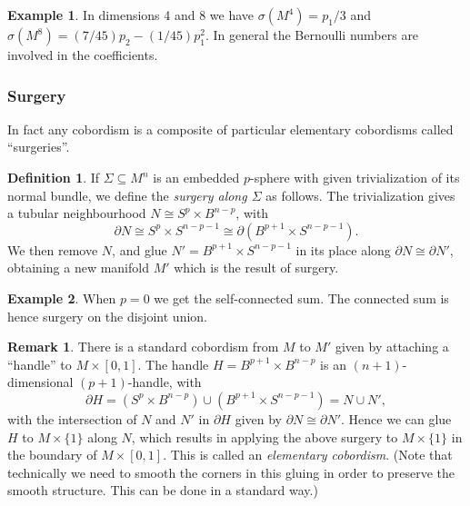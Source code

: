 \documentclass{article}
\theoremstyle{definition}
\newtheorem*{definition}{Definition}
\newtheorem*{example}{Example}
\newtheorem*{remark}{Remark}
\begin{document}
\begin{example}
    In dimensions 4 and 8 we have $\sigma(M^4)=p_1/3$ and
    $\sigma(M^8)=(7/45)p_2-(1/45)p_1^2$. In general the Bernoulli numbers are
    involved in the coefficients.
\end{example}

\subsubsection*{Surgery}

In fact any cobordism is a composite of particular elementary cobordisms called
``surgeries''.

\begin{definition}
    If $\Sigma\subseteq M^n$ is an embedded $p$-sphere with given trivialization
    of its normal bundle, we define the \emph{surgery along $\Sigma$} as
    follows. The trivialization gives a tubular neighbourhood
    $N\cong S^p\times B^{n-p}$, with
    \begin{equation*}
        \partial N
            \cong S^p\times S^{n-p-1}
            \cong \partial(B^{p+1}\times S^{n-p-1}).
    \end{equation*}
    We then remove $N$, and glue $N'=B^{p+1}\times S^{n-p-1}$ in its place along
    $\partial N\cong\partial N'$, obtaining a new manifold $M'$ which is the
    result of surgery.
\end{definition}

\begin{example}
    When $p=0$ we get the self-connected sum. The connected sum is hence surgery
    on the disjoint union.
\end{example}

\begin{remark}
    There is a standard cobordism from $M$ to $M'$ given by attaching a
    ``handle'' to $M\times[0,1]$. The handle $H=B^{p+1}\times B^{n-p}$ is an
    $(n+1)$-dimensional $(p+1)$-handle, with
    \begin{equation*}
        \partial H
            = (S^p\times B^{n-p})\cup(B^{p+1}\times S^{n-p-1})
            = N\cup N',
    \end{equation*}
    with the intersection of $N$ and $N'$ in $\partial H$ given by
    $\partial N\cong\partial N'$. Hence we can glue $H$ to $M\times\{1\}$ along
    $N$, which results in applying the above surgery to $M\times\{1\}$ in the
    boundary of $M\times[0,1]$. This is called an \emph{elementary cobordism}.
    (Note that technically we need to smooth the corners in this gluing in order
    to preserve the smooth structure. This can be done in a standard way.)
\end{remark}
\end{document}
